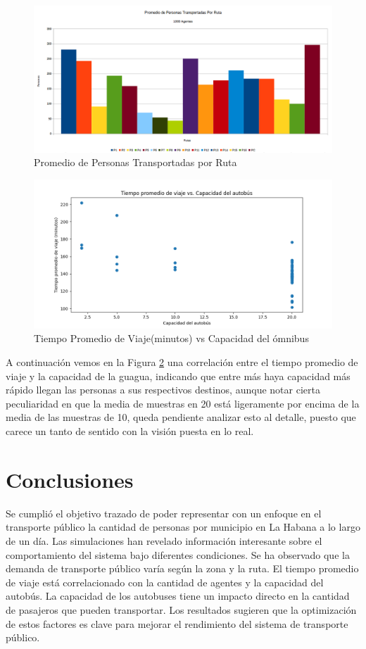 \documentclass[a4paper,12pt]{article}
\begin{document}
\begin{figure}[H]
     \hspace{-2cm}
    \includegraphics[width=1.3\textwidth]{imgs/pptr.png}
    \caption{Promedio de Personas Transportadas por Ruta}
    \label{fig:6}
\end{figure}
\begin{figure}[H]
    \centering
    \includegraphics[width=1\textwidth]{imgs/tiempo_capacidad.png}
    \caption{Tiempo Promedio de Viaje(minutos) vs Capacidad del \'omnibus}
    \label{fig:7}
\end{figure}
\newpage
A continuaci\'on vemos en la Figura \ref{fig:7} una correlaci\'on entre el tiempo promedio de viaje y la capacidad de la guagua, indicando que entre m\'as haya capacidad m\'as r\'apido llegan las personas a sus respectivos destinos, aunque notar cierta peculiaridad en que la media de muestras en 20 est\'a ligeramente por encima de la media de las muestras de 10, queda pendiente analizar esto al detalle, puesto que carece un tanto de sentido con la visi\'on puesta en lo real. 


\section{Conclusiones}
Se cumpli\'o el objetivo trazado de poder representar con un enfoque en el transporte p\'ublico la cantidad de personas por municipio en La Habana a lo largo de un d\'ia. Las simulaciones han revelado información interesante sobre el comportamiento del sistema bajo diferentes condiciones. Se ha observado que la demanda de transporte público varía según la zona y la ruta. El tiempo promedio de viaje está correlacionado con la cantidad de agentes y la capacidad del autobús. La capacidad de los autobuses tiene un impacto directo en la cantidad de pasajeros que pueden transportar. Los resultados sugieren que la optimización de estos factores es clave para mejorar el rendimiento del sistema de transporte público. 
\end{document}
